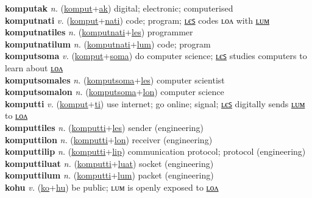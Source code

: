 \textbf{komputak} \textit{n.} (\hyperref[komput]{komput}+\hyperref[ak]{ak})
digital; electronic; computerised \label{komputak} \\
\textbf{komputnati} \textit{v.} (\hyperref[komput]{komput}+\hyperref[nati]{nati})
code; program; \hyperref[komputnatiles]{ʟєꜱ} codes ʟᴏᴧ with \hyperref[komputnatilum]{ʟᴜᴍ} \label{komputnati} \\
\textbf{komputnatiles} \textit{n.} (\hyperref[komputnati]{komputnati}+\hyperref[les]{les})
programmer \label{komputnatiles} \\
\textbf{komputnatilum} \textit{n.} (\hyperref[komputnati]{komputnati}+\hyperref[lum]{lum})
code; program \label{komputnatilum} \\
\textbf{komputsoma} \textit{v.} (\hyperref[komput]{komput}+\hyperref[soma]{soma})
do computer science; \hyperref[komputsomales]{ʟєꜱ} studies computers to learn about \hyperref[komputsomalon]{ʟᴏᴧ} \label{komputsoma} \\
\textbf{komputsomales} \textit{n.} (\hyperref[komputsoma]{komputsoma}+\hyperref[les]{les})
computer scientist \label{komputsomales} \\
\textbf{komputsomalon} \textit{n.} (\hyperref[komputsoma]{komputsoma}+\hyperref[lon]{lon})
computer science \label{komputsomalon} \\
\textbf{komputti} \textit{v.} (\hyperref[komput]{komput}+\hyperref[ti]{ti})
use internet; go online; signal; \hyperref[komputtiles]{ʟєꜱ} digitally sends \hyperref[komputtilum]{ʟᴜᴍ} to \hyperref[komputtilon]{ʟᴏᴧ} \label{komputti} \\
\textbf{komputtiles} \textit{n.} (\hyperref[komputti]{komputti}+\hyperref[les]{les})
sender (engineering) \label{komputtiles} \\
\textbf{komputtilon} \textit{n.} (\hyperref[komputti]{komputti}+\hyperref[lon]{lon})
receiver (engineering) \label{komputtilon} \\
\textbf{komputtilip} \textit{n.} (\hyperref[komputti]{komputti}+\hyperref[lip]{lip})
communication protocol; protocol (engineering) \label{komputtilip} \\
\textbf{komputtiluat} \textit{n.} (\hyperref[komputti]{komputti}+\hyperref[luat]{luat})
socket (engineering) \label{komputtiluat} \\
\textbf{komputtilum} \textit{n.} (\hyperref[komputti]{komputti}+\hyperref[lum]{lum})
packet (engineering) \label{komputtilum} \\
\textbf{kohu} \textit{v.} (\hyperref[ko]{ko}+\hyperref[hu]{hu})
be public; ʟᴜᴍ is openly exposed to \hyperref[kohulon]{ʟᴏᴧ} \label{kohu} \\
